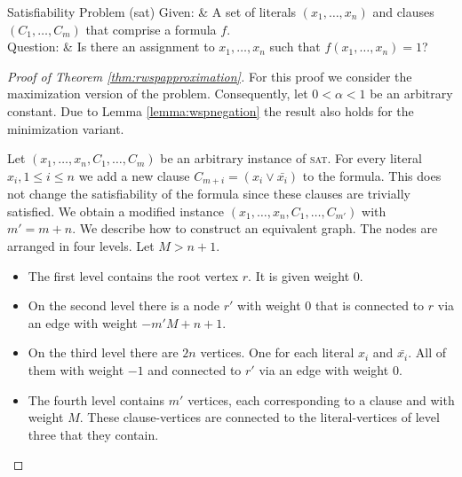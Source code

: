 \begin{problembox}[framed]{Satisfiability Problem (sat)}
	Given: & A set of literals $(x_1, \ldots, x_n)$ and clauses $(C_1, \ldots, C_m)$ that comprise a formula $f$.\\
	Question: & Is there an assignment to $x_1, \ldots, x_n$ such that $f(x_1, \ldots, x_n) = 1$?
	\label{problem:sat}
\end{problembox}\vspace{1em}

\begin{proof}[Proof of Theorem \ref{thm:rwspapproximation}]
	For this proof we consider the maximization version of the problem. Consequently, let $0 < \alpha < 1$ be an arbitrary constant. Due to Lemma \ref{lemma:wspnegation} the result also holds for the minimization variant.\medskip
	
	Let $(x_1, \ldots, x_n, C_1, \ldots, C_m)$ be an arbitrary instance of \textsc{sat}. For every literal $x_i, 1 \leq i \leq n$ we add a new clause $C_{m+i} = (x_i \lor \bar{x_i})$ to the formula. This does not change the satisfiability of the formula since these clauses are trivially satisfied. We obtain a modified instance $(x_1, \ldots, x_n, C_1, \ldots, C_{m'})$ with $m'=m + n$. We describe how to construct an equivalent graph. The nodes are arranged in four levels. Let $M > n + 1$.
	\begin{itemize}
		\item The first level contains the root vertex $r$. It is given weight $0$.
		\item On the second level there is a node $r'$ with weight $0$ that is connected to $r$ via an edge with weight $-m'M + n+ 1$.
		\item On the third level there are $2n$ vertices. One for each literal $x_i$ and $\bar{x_i}$. All of them with weight $-1$ and connected to $r'$ via an edge with weight $0$.
		\item The fourth level contains $m'$ vertices, each corresponding to a clause and with weight $M$. These clause-vertices are connected to the literal-vertices of level three that they contain.
	\end{itemize}

	\begin{figure}[H]
		\centering
\end{figure}
\end{proof}
